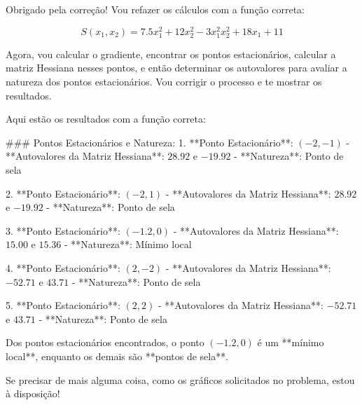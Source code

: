Obrigado pela correção! Vou refazer os cálculos com a função correta:

\[
S(x_1, x_2) = 7.5x_1^2 + 12x_2^2 - 3x_1^2x_2^2 + 18x_1 + 11
\]

Agora, vou calcular o gradiente, encontrar os pontos estacionários, calcular a matriz Hessiana nesses pontos, e então determinar os autovalores para avaliar a natureza dos pontos estacionários. Vou corrigir o processo e te mostrar os resultados.

Aqui estão os resultados com a função correta:

### Pontos Estacionários e Natureza:
1. **Ponto Estacionário**: \((-2, -1)\) 
   - **Autovalores da Matriz Hessiana**: \(28.92\) e \(-19.92\)
   - **Natureza**: Ponto de sela

2. **Ponto Estacionário**: \((-2, 1)\)
   - **Autovalores da Matriz Hessiana**: \(28.92\) e \(-19.92\)
   - **Natureza**: Ponto de sela

3. **Ponto Estacionário**: \((-1.2, 0)\)
   - **Autovalores da Matriz Hessiana**: \(15.00\) e \(15.36\)
   - **Natureza**: Mínimo local

4. **Ponto Estacionário**: \((2, -2)\)
   - **Autovalores da Matriz Hessiana**: \(-52.71\) e \(43.71\)
   - **Natureza**: Ponto de sela

5. **Ponto Estacionário**: \((2, 2)\)
   - **Autovalores da Matriz Hessiana**: \(-52.71\) e \(43.71\)
   - **Natureza**: Ponto de sela

Dos pontos estacionários encontrados, o ponto \((-1.2, 0)\) é um **mínimo local**, enquanto os demais são **pontos de sela**.

Se precisar de mais alguma coisa, como os gráficos solicitados no problema, estou à disposição!
